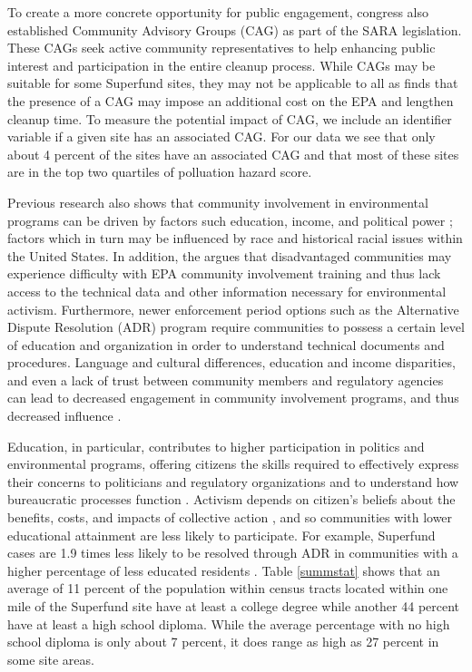 \documentclass[12pt]{article}
\begin{document}
To create a more concrete opportunity for public engagement, congress also established Community Advisory Groups (CAG) as part of the SARA legislation. These CAGs seek active community representatives to help enhancing public interest and participation in the entire cleanup process. While CAGs may be suitable for some Superfund sites, they may not be applicable to all as \textcite{daley2004policy} finds that the presence of a CAG may impose an additional cost on the EPA and lengthen cleanup time. To measure the potential impact of CAG, we include an identifier variable if a given site has an associated CAG. For our data we see that only about 4 percent of the sites have an associated CAG and that most of these sites are in the top two quartiles of polluation hazard score. 

Previous research also shows that community involvement in environmental programs can be driven by factors such education, income, and political power \parencite{daniels2012public, OEJ2017}; factors which in turn may be influenced by race and historical racial issues within the United States. In addition, the \textcite{united2003not} argues that disadvantaged communities may experience difficulty with EPA community involvement training and thus lack access to the technical data and other information necessary for environmental activism. Furthermore, newer enforcement period options such as the Alternative Dispute Resolution (ADR) program require communities to possess a certain level of education and organization in order to understand technical documents and procedures. Language and cultural differences, education and income disparities, and even a lack of trust between community members and regulatory agencies can lead to decreased engagement in community involvement programs, and thus decreased influence \parencite{EPA2011}.

Education, in particular, contributes to higher participation in politics and environmental programs, offering citizens the skills required to effectively express their concerns to politicians and regulatory organizations \parencite{verba1995voice} and to understand how bureaucratic processes function \parencite{Howell1992, rosenstone1993mobilization}. Activism depends on citizen's beliefs about the benefits, costs, and impacts of collective action \parencite{finkel1989personal}, and so communities with lower educational attainment are less likely to participate. For example, Superfund cases are 1.9 times less likely to be resolved through ADR in communities with a higher percentage of less educated residents \parencite{Collins2008}. Table \ref{summstat} shows that an average of 11 percent of the population within census tracts located within one mile of the Superfund site have at least a college degree while another 44 percent have at least a high school diploma. While the average percentage with no high school diploma is only about 7 percent, it does range as high as 27 percent in some site areas. 
\end{document}

